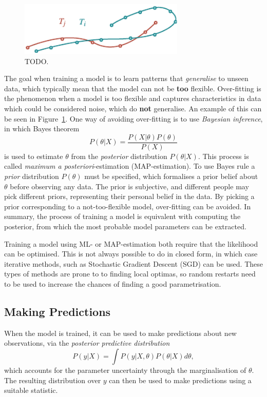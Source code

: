 \begin{figure}
  \centering
  \includegraphics[width=0.7\textwidth]{figures/trajectory-projection-problems}
  \caption{TODO.}\label{fig:over-fitting-example}
\end{figure}

The goal when training a model is to learn patterns that
\textit{generalise} to unseen data, which typically mean that the
model can not be \textbf{too} flexible. Over-fitting is the phenomenon
when a model is too flexible and captures characteristics in data which could be
considered noise, which do \textbf{not} generalise. An example of
this can be seen in Figure~\ref{fig:over-fitting-example}. One way of
avoiding over-fitting is to use \textit{Bayesian inference}, in which 
Bayes theorem
\begin{equation}
  \label{eq:bayes}
  P(\theta \vert X) = \frac{P(X \vert \theta) P(\theta)}{P(X)}
\end{equation}
is used to estimate $\theta$ from the \textit{posterior} distribution $P(\theta \vert X)$.
This process is called \textit{maximum a posteriori}-estimation (MAP-estimation). To use Bayes
rule a \textit{prior} distribution $P(\theta)$ must be specified, which formalises
a prior belief about $\theta$ before observing any data. The prior is
subjective, and different people may pick different priors,
representing their personal belief in the data. By picking a
prior corresponding to a not-too-flexible model, over-fitting can be
avoided. In summary, the process of training a model is equivalent with computing
the posterior, from which the most probable model parameters can be
extracted.  

Training a model using ML- or MAP-estimation both require that the
likelihood can be optimised. This is not always possible to do in
closed form, in which case iterative methods, such as Stochastic
Gradient Descent (SGD) can be used. These types of methods are
prone to to finding local optimas, so random restarts need to be used
to increase the chances of finding a good parametrisation.

\subsection{Making Predictions}
When the model is trained, it can be used to make predictions
about new observations, via the \textit{posterior
  predictive distribution}
\begin{equation}
  \label{eq:posterior-predictive}
  P(y \vert X) = \int P(y|X,\theta)P(\theta \vert X) d \theta,
\end{equation}
which accounts for the parameter uncertainty through the
marginalisation of $\theta$. The resulting distribution over $y$ can
then be used to make predictions using a suitable statistic. 

